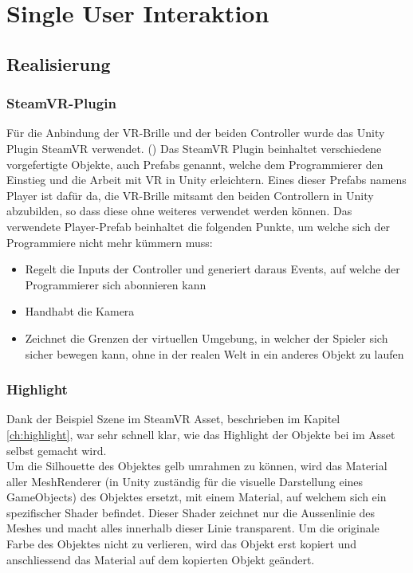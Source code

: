 \chapter{Single User Interaktion}
\label{ch:Single_User_Interaktion}

\section{Realisierung}

\subsection{SteamVR-Plugin}
\label{ch:steamvr_plugin}

Für die Anbindung der VR-Brille und der beiden Controller wurde das Unity Plugin SteamVR verwendet. (\cite{noauthor_steamvr_2019}) Das SteamVR Plugin beinhaltet verschiedene vorgefertigte Objekte, auch Prefabs genannt, welche dem Programmierer den Einstieg und die Arbeit mit VR in Unity erleichtern. Eines dieser Prefabs namens \grqq Player\grqq{} ist dafür da, die VR-Brille mitsamt den beiden Controllern in Unity abzubilden, so dass diese ohne weiteres verwendet werden können. 
Das verwendete \grqq Player\grqq-Prefab beinhaltet die folgenden Punkte, um welche sich der Programmiere nicht mehr kümmern muss:

\begin{itemize} [itemsep=1pt,topsep=0pt]
	\item Regelt die Inputs der Controller und generiert daraus Events, auf welche der Programmierer sich abonnieren kann
	\item Handhabt die Kamera
	\item Zeichnet die Grenzen der virtuellen Umgebung, in welcher der Spieler sich sicher bewegen kann, ohne in der realen Welt in ein anderes Objekt zu laufen
\end{itemize}
 

\subsection{Highlight}
\label{ch:highlight_realisierung}
Dank der Beispiel Szene im SteamVR Asset, beschrieben im Kapitel \ref{ch:highlight}, war sehr schnell klar, wie das Highlight der Objekte bei im Asset selbst gemacht wird. \\
Um die Silhouette des Objektes gelb umrahmen zu können, wird das Material aller MeshRenderer (in Unity zuständig für die visuelle Darstellung eines GameObjects) des Objektes ersetzt, mit einem Material, auf welchem sich ein spezifischer Shader befindet. Dieser Shader zeichnet nur die Aussenlinie des Meshes und macht alles innerhalb dieser Linie transparent. Um die originale Farbe des Objektes nicht zu verlieren, wird das Objekt erst kopiert und anschliessend das Material auf dem kopierten Objekt geändert. \\

